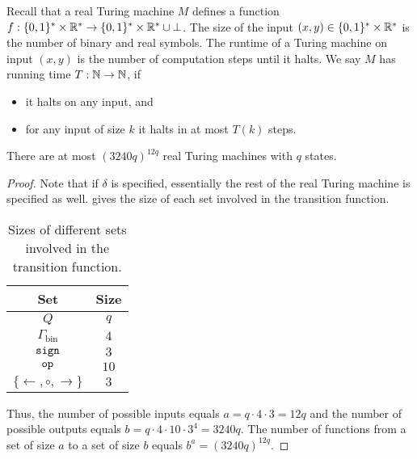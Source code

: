 \documentclass{article}
\begin{document}
\begin{definition}[Runtime]
    Recall that a real Turing machine $M$ defines a function $f : \{0,1\}^*\times \mathbb{R}^* \rightarrow \{0,1\}^*\times \mathbb{R}^* \cup \bot$.
    The size of the input $(x,y) \in \{0,1\}^*\times \mathbb{R}^*$ is the number of binary and real symbols.
    The runtime of a Turing machine on input $(x,y)$ is the number of computation steps until it halts.
    We say $M$ has running time $T : \mathbb{N} \rightarrow \mathbb{N}$, if 
    \begin{itemize}
        \item it halts on any input, and
        \item for any input of size $k$ it halts in at most $T(k)$ steps.
    \end{itemize}
\end{definition}

\begin{lemma}
\label{lem:NrRTMsinstates}
    There are at most 
    $(3240q)^{12 q}$ real Turing machines with $q$ states.
\end{lemma}
\begin{proof}
    Note that if $\delta$ is specified, essentially the rest of the real Turing machine is specified as well.
     gives the size of each set involved in the transition function.
    \begin{table}
        \centering
        \begin{tabular}{|cc|}
        \hline
        \textbf{Set} & \textbf{Size} \\
        \hline
        $Q$ & $q$ \\
        $\Gamma_{\text{bin}}$ & $4$ \\
        $\texttt{sign}$ & $3$  \\
        $\texttt{op}$ & $10$\\
        $\{\leftarrow, \circ, \rightarrow\}$ & $3$ \\
        \hline
        \end{tabular}
        \caption{Sizes of different sets involved in the transition function.}
        \label{tab:setsizes}
    \end{table}
Thus, the number of possible inputs equals $a= q\cdot 4 \cdot 3 = 12 q$
and the number of possible outputs equals $b = q \cdot 4 \cdot 10 \cdot 3^4 = 3240 q$.
The number of functions from a set of size $a$ to a set of size $b$ equals $b^a = (3240q)^{12q}$.
\end{proof}

\end{document}
